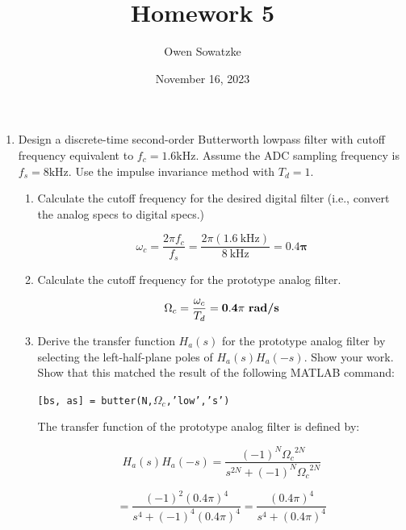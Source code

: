 \documentclass[fleqn]{article}
\title{Homework 5}
\author{Owen Sowatzke}
\date{November 16, 2023}
\newcommand{\zerodisplayskip}{
	\setlength{\abovedisplayskip}{0pt}%
	\setlength{\belowdisplayskip}{0pt}%
	\setlength{\abovedisplayshortskip}{0pt}%
	\setlength{\belowdisplayshortskip}{0pt}%
	\setlength{\mathindent}{0pt}}
\begin{document}
	\offinterlineskip
	\setlength{\lineskip}{12pt}
	\zerodisplayskip
	\maketitle
	
	\begin{enumerate}[nolistsep]
		\item Design a discrete-time second-order Butterworth lowpass filter with cutoff frequency equivalent to $f_c = 1.6 \text{kHz}$. Assume the ADC sampling frequency is $f_s = 8 \text{kHz}$. Use the impulse invariance method with $T_d = 1$.
		
			\begin{enumerate}[nolistsep]
				\item Calculate the cutoff frequency for the desired digital filter (i.e., convert the analog specs to digital specs.)
				
					\begin{equation*}
						\omega_c = \frac{2{\pi}f_c}{f_s} = \frac{2{\pi}(1.6\ \text{kHz})}{8\ \text{kHz}} = \mathbf{0.4\pi}
					\end{equation*}
					
				\item Calculate the cutoff frequency for the prototype analog filter.
				
					\begin{equation*}
						\Omega_c = \frac{\omega_c}{T_d} = \mathbf{0.4\pi\ \text{\textbf{rad/s}}} 
					\end{equation*}
					
				\item Derive the transfer function $H_a(s)$ for the prototype analog filter by selecting the left-half-plane poles of $H_a(s)H_a(-s)$. Show your work. Show that this matched the result of the following MATLAB command:
				
				\texttt{[bs, as] = butter(N,$\Omega_c$,'low','s')}
				
				The transfer function of the prototype analog filter is defined by:
				
				\begin{equation*}
					H_a(s)H_a(-s) = \frac{(-1)^N{\Omega_c}^{2N}}{s^{2N} + (-1)^N{\Omega_c}^{2N}}
				\end{equation*}
				
				\begin{equation*}
					= \frac{(-1)^2(0.4\pi)^4}{s^4 + (-1)^4(0.4\pi)^4} = \frac{(0.4\pi)^4}{s^4 + (0.4\pi)^4}
				\end{equation*}
				

\end{enumerate}
\end{enumerate}
\end{document}
